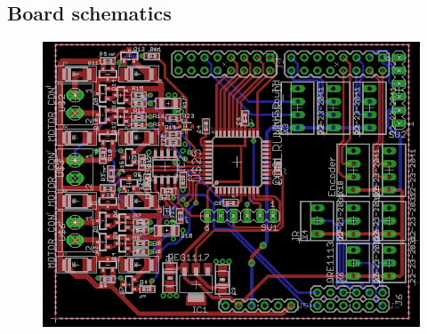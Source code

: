\subsection{Board schematics}
\begin{figure}[!ht]
	\centering
	\includegraphics[width=1\textwidth]{figures/BoardSche.PNG}
	\caption{}
	\label{boardpcb}
\end{figure}

